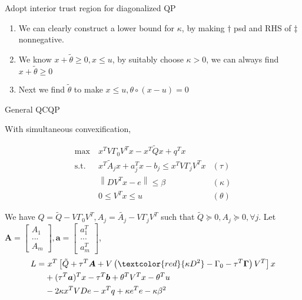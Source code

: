 \documentclass{beamerswitch}
\newcommand{\st}{\mathrm{s.t.\;}}
\newcommand{\red}[1]{\textcolor{red}{#1}}
\begin{document}
\begin{frame}[allowframebreaks]{Adopt interior trust region for diagonalized QP}
  \begin{enumerate}
    \item We can clearly construct a lower bound for \(\kappa\), by making \(\dagger\) psd and RHS of \(\ddagger\) nonnegative.
    \item We know \(x + \tilde \theta \ge 0, x\le u \), by suitably choose \(\kappa > 0\), we can always find \(x + \tilde \theta \ge 0\)
    \item Next we find \(\tilde \theta \) to make \(x \le u, \theta \circ (x - u) = 0\)
  \end{enumerate}
\end{frame}

\begin{frame}[allowframebreaks]{General QCQP}

  With simultaneous convexification,

  \begin{equation}\label{eq.int.qcqp}
    \begin{aligned}
      \max ~ & x^TV\Gamma_0V^T x - x^T\tilde Q x + q^Tx                         \\
      \st  ~ & x^T\tilde A_j x + a_j ^Tx - b_j \le x^TV\Gamma_j V^Tx & (\tau)   \\
             & \left \|DV^Tx - e  \right \|  \le \beta               & (\kappa) \\
             & 0 \le V^Tx \le u                                      & (\theta)
    \end{aligned}
  \end{equation}

  We have \(Q = \tilde{Q} - V\Gamma_0V^T, A_j = \tilde{A_j} - V\Gamma_j V^T\) such that \(\tilde{Q} \succeq 0, A_j \succeq 0, \forall j\). Let \(\bm A = \begin{bmatrix}    A_1 \\ ... \\ A_m  \end{bmatrix}, \bm a = \begin{bmatrix}
    a_1^T \\...\\a_m^T  \end{bmatrix} \),
  \begin{align*}
    L = & ~ x^T\left[\tilde Q + \tau^T \bm A + V\left (\red{\kappa D^2} - \Gamma_0 - \tau^T \bm \Gamma \right )V^T\right ]x \\
        & + (\tau^T\bm a)^T x- \tau^T \bm b + \theta^TV^Tx - \theta^Tu                                                      \\
        & - 2 \kappa x^T VDe - x^Tq + \kappa e^Te - \kappa \beta^2
  \end{align*}
  \framebreak


\end{frame}
\end{document}
